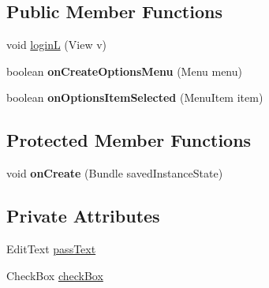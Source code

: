 \subsection*{Public Member Functions}
\begin{DoxyCompactItemize}
\item 
void \hyperlink{classcom_1_1example_1_1sebastian_1_1tindertp_1_1LoginActivity_a96627280f892b2702e01699f75899a06}{loginL} (View v)
\item 
boolean {\bfseries on\+Create\+Options\+Menu} (Menu menu)\hypertarget{classcom_1_1example_1_1sebastian_1_1tindertp_1_1LoginActivity_ad0ba0f0bed60797acd7b45e2a3aab9d1}{}\label{classcom_1_1example_1_1sebastian_1_1tindertp_1_1LoginActivity_ad0ba0f0bed60797acd7b45e2a3aab9d1}

\item 
boolean {\bfseries on\+Options\+Item\+Selected} (Menu\+Item item)\hypertarget{classcom_1_1example_1_1sebastian_1_1tindertp_1_1LoginActivity_a34e9db18d0f3d06b5a0a33b0e89e2651}{}\label{classcom_1_1example_1_1sebastian_1_1tindertp_1_1LoginActivity_a34e9db18d0f3d06b5a0a33b0e89e2651}

\end{DoxyCompactItemize}
\subsection*{Protected Member Functions}
\begin{DoxyCompactItemize}
\item 
void {\bfseries on\+Create} (Bundle saved\+Instance\+State)\hypertarget{classcom_1_1example_1_1sebastian_1_1tindertp_1_1LoginActivity_a16c3f224cb166a736cbb7d3f6ec59b2d}{}\label{classcom_1_1example_1_1sebastian_1_1tindertp_1_1LoginActivity_a16c3f224cb166a736cbb7d3f6ec59b2d}

\end{DoxyCompactItemize}
\subsection*{Private Attributes}
\begin{DoxyCompactItemize}
\item 
Edit\+Text \hyperlink{classcom_1_1example_1_1sebastian_1_1tindertp_1_1LoginActivity_a8590bdba6d094c75f8dd360c5a78c928}{pass\+Text}
\item 
Check\+Box \hyperlink{classcom_1_1example_1_1sebastian_1_1tindertp_1_1LoginActivity_a429a1234958cee5c83b36522f16ae100}{check\+Box}
\end{DoxyCompactItemize}


